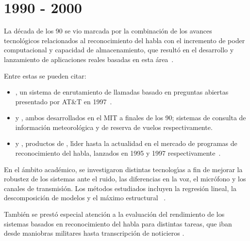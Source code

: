 \section{1990 - 2000}
\label{sec:90s}

La d\'ecada de los 90 se vio marcada por la combinaci\'on de los avances tecnol\'ogicos relacionados al reconocimiento del habla con el incremento de poder computacional y capacidad de almacenamiento, que result\'o en el desarrollo y
lanzamiento de aplicaciones reales basadas en esta \mbox{\'area \cite{JuangAutomaticSpeech, GauvainLarge2000}}.

Entre estas se pueden citar:
\begin{itemize}
\item {}, un sistema de enrutamiento de llamadas basado en preguntas abiertas presentado por 
AT\&T en \mbox{1997 \cite{Sachs97howmay}}. 

\item {} y , ambos desarrollados en el MIT a finales de los 90; sistemas de consulta de informaci\'on meteorol\'ogica \cite{ZueJupiter2000} y  de reserva de vuelos \cite{Seneff2000Dialogue} respectivamente.

\item {} y , productos de , l{\'\i}der hasta la actualidad en el mercado de programas de reconocimiento del habla, lanzados en 1995 y 1997 
\mbox{respectivamente \cite{BarnettMultilingual1996, BlandingSpeechless2012}}.
\end{itemize}

En el \'ambito acad\'emico, se investigaron distintas tecnolog{\'\i}as a fin de mejorar la robustez de los sistemas ante el ruido, las diferencias en la voz, el micr\'ofono y los canales de transmis{\'\i}\'on. Los m\'etodos estudiados incluyen la regresi\'on lineal,
la descomposici\'on de modelos y el m\'aximo estructural \mbox{ \cite{AnusuyaSpeech2009}}.

Tambi\'en se prest\'o especial atenci\'on a la evaluaci\'on del rendimiento de los sistemas basados en reconocimiento del habla para distintas tareas, que iban desde maniobras militares hasta transcripci\'on de noticieros \cite{JuangAutomaticSpeech}.